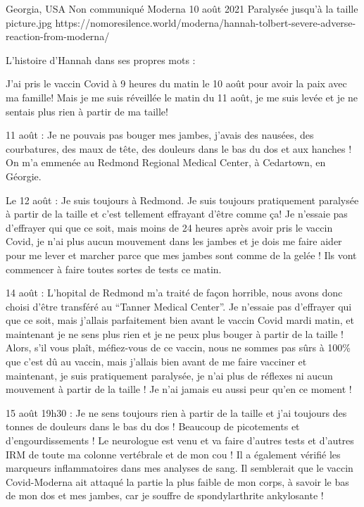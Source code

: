 {Georgia, USA}
{Non communiqué}
{Moderna}
{10 août 2021}
{Paralysée jusqu'à la taille}
{picture.jpg}
{https://nomoresilence.world/moderna/hannah-tolbert-severe-adverse-reaction-from-moderna/}
{

L'histoire d'Hannah dans ses propres mots :

J'ai pris le vaccin Covid à 9 heures du matin le 10 août pour avoir la paix avec
ma famille! Mais je me suis réveillée le matin du 11 août, je me suis levée et
je ne sentais plus rien à partir de ma taille!

11 août : Je ne pouvais pas bouger mes jambes, j'avais des nausées, des
courbatures, des maux de tête, des douleurs dans le bas du dos et aux hanches !
On m'a emmenée au Redmond Regional Medical Center, à Cedartown, en Géorgie.

Le 12 août : Je suis toujours à Redmond. Je suis toujours pratiquement paralysée
à partir de la taille et c'est tellement effrayant d'être comme ça! Je n'essaie
pas d'effrayer qui que ce soit, mais moins de 24 heures après avoir pris le
vaccin Covid, je n'ai plus aucun mouvement dans les jambes et je dois me faire
aider pour me lever et marcher parce que mes jambes sont comme de la gelée ! Ils
vont commencer à faire toutes sortes de tests ce matin.

14 août : L'hopital de Redmond m'a traité de façon horrible, nous avons donc
choisi d'être transféré au “Tanner Medical Center”. Je n'essaie pas d'effrayer
qui que ce soit, mais j'allais parfaitement bien avant le vaccin Covid mardi
matin, et maintenant je ne sens plus rien et je ne peux plus bouger à partir de
la taille ! Alors, s'il vous plaît, méfiez-vous de ce vaccin, nous ne sommes pas
sûrs à 100\% que c'est dû au vaccin, mais j'allais bien avant de me faire
vacciner et maintenant, je suis pratiquement paralysée, je n'ai plus de réflexes
ni aucun mouvement à partir de la taille ! Je n'ai jamais eu aussi peur qu'en ce
moment !

15 août 19h30 : Je ne sens toujours rien à partir de la taille et j'ai toujours
des tonnes de douleurs dans le bas du dos ! Beaucoup de picotements et
d'engourdissements ! Le neurologue est venu et va faire d'autres tests et
d'autres IRM de toute ma colonne vertébrale et de mon cou ! Il a également
vérifié les marqueurs inflammatoires dans mes analyses de sang. Il semblerait
que le vaccin Covid-Moderna ait attaqué la partie la plus faible de mon corps, à
savoir le bas de mon dos et mes jambes, car je souffre de spondylarthrite
ankylosante !

}
